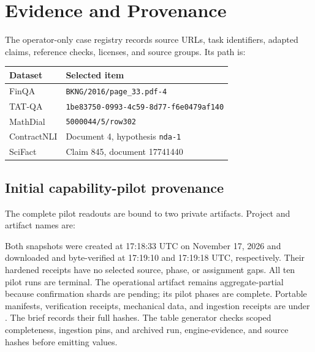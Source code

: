 \section{Evidence and Provenance}
\label{app:evidence}
The operator-only case registry records source URLs, task identifiers, adapted
claims, reference checks, licenses, and source groups. Its path is:
\begin{quote}\small
{}
\end{quote}
\begin{center}\small
\begin{tabular}{ll}
\toprule Dataset & Selected item\\
\midrule
FinQA & \texttt{BKNG/2016/page\_33.pdf-4}\\
TAT-QA & \texttt{1be83750-0993-4c59-8d77-f6e0479af140}\\
MathDial & \texttt{5000044/5/row302}\\
ContractNLI & Document 4, hypothesis \texttt{nda-1}\\
SciFact & Claim 845, document 17741440\\
\bottomrule
\end{tabular}
\end{center}
\subsection{Initial capability-pilot provenance}
\label{app:pilot-locators}
The complete pilot readouts are bound to two private artifacts. Project and
artifact names are:
\begin{quote}\small
{}
\par\medskip
{}
\par\medskip
{}
\end{quote}
Both snapshots were created at 17:18:33 UTC on November 17, 2026 and downloaded
and byte-verified at 17:19:10 and 17:19:18 UTC, respectively. Their hardened
receipts have no selected source, phase, or assignment gaps. All ten pilot runs
are terminal. The operational artifact remains aggregate-partial because
confirmation shards are pending; its pilot phases are complete. Portable
manifests, verification receipts, mechanical data, and ingestion receipts are
under . The brief records their full
hashes. The table generator checks scoped completeness, ingestion pins, and
archived run, engine-evidence, and source hashes before emitting values.

